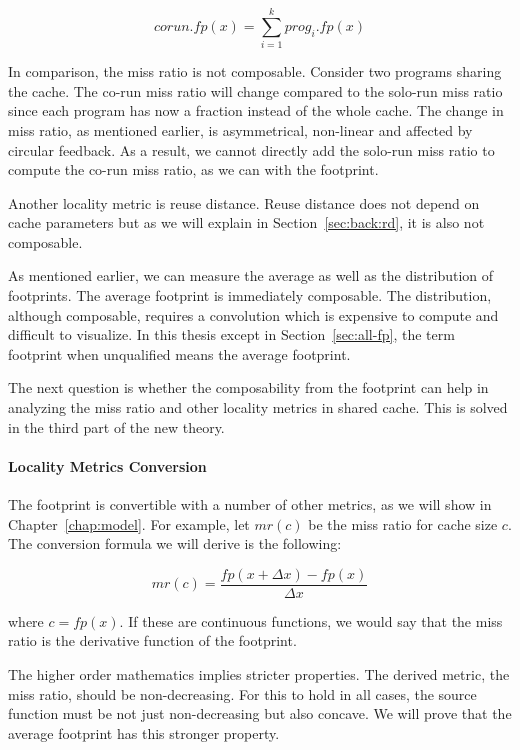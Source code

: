 $$ corun.fp(x) = \sum_{i=1}^k prog_i.fp(x) $$

In comparison, the miss ratio is not composable.  Consider two
programs sharing the cache.  The co-run miss ratio will change
compared to the solo-run miss ratio since each program has
now a fraction instead of the whole cache.  The change in miss ratio, as mentioned
earlier, is asymmetrical, non-linear and affected by circular
feedback.  As a result, we cannot directly add the solo-run miss ratio 
to compute the co-run miss
ratio, as we can with the footprint. 

Another locality metric is reuse distance.  Reuse distance does
not depend on cache parameters but as we will explain
in Section~\ref{sec:back:rd}, it is also not composable.


As mentioned earlier, we can measure the average as well as
the distribution of footprints.  
The average footprint is immediately composable.  The distribution, although composable, requires
a convolution which is expensive to compute and difficult
to visualize.  In this thesis except in Section~\ref{sec:all-fp}, 
the term footprint when unqualified means the average
footprint.

The next question is whether the composability from the footprint 
can help in analyzing the miss ratio and other locality metrics in
shared cache.  This is solved in
the third part of the new theory.

\paragraph{Locality Metrics Conversion}
The footprint is convertible with a number of other metrics,
as we will show in Chapter~\ref{chap:model}.  For example, let $mr(c)$ be the miss ratio
for cache size $c$.  The conversion formula we will derive is the
following:

$$\textit{mr}(c) = \frac{\textit{fp}(x+\Delta x) - fp(x)}{\Delta x}$$

\noindent where $c = \textit{fp}(x)$.  If these are continuous
functions, we would say that the miss ratio is the derivative function
of the footprint.  

The higher order mathematics implies stricter
properties.  The derived metric, the miss ratio, should be
non-decreasing.  For this to hold in all cases, the source function 
must be not just non-decreasing but also
concave.  We will prove that the average
footprint has this stronger property.  

